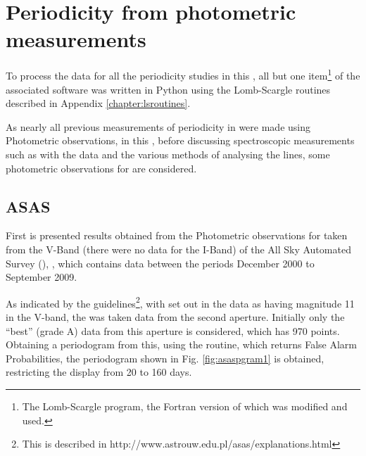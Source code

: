 \chapter{Periodicity from photometric measurements} %
\protect\label{chapter:photometry}

To process the data for all the periodicity studies in this \paperorthesis, all but one item\footnote{The {\numrecs}
  Lomb-Scargle program, the Fortran version of which was modified and used.} of the associated software was written in
Python using the Lomb-Scargle routines described in Appendix \ref{chapter:lsroutines}.

As nearly all previous measurements of periodicity in {\prox} were made using Photometric observations, in this
{\paperorthesis}, before discussing spectroscopic measurements such as with the {\harps} data and the various methods of
analysing the {\ha} lines, some photometric observations for {\prox} are considered.

\section{ASAS}
\protect\label{section:asas}

First is presented results obtained from the Photometric observations for {\prox} taken from the V-Band (there were no
data for the I-Band) of the All Sky Automated Survey (\asas), \citep{pojmanski97}, which contains data between the
periods December 2000 to September 2009.

As indicated by the {\asas} guidelines\footnote{This is described in http://www.astrouw.edu.pl/asas/explanations.html},
with {\prox} set out in the {\asas} data as having magnitude 11 in the V-band, the  was taken data from the second
aperture. Initially only the ``best'' (grade A) data from this aperture is considered, which has 970 points. Obtaining a
periodogram from this, using the {\numrecs} routine, which returns False Alarm Probabilities, the periodogram shown in
Fig. \ref{fig:asaspgram1} is obtained, restricting the display from 20 to 160 days.

